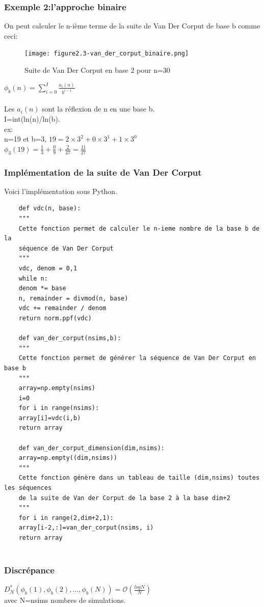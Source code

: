 \documentclass[12pt]{report}
\begin{document}
\subsubsection{Exemple 2:l'approche binaire}
On peut calculer le n-ième terme de la suite de Van Der Corput de base b comme ceci:
\begin{figure}[h]
	\begin{center}
		\texttt{[image: figure2.3-van\_der\_corput\_binaire.png]}\\
	\end{center}
	\caption{Suite de Van Der Corput en base 2 pour n=30}
\end{figure}
$\phi_b(n)=\sum_{i=0}^{I}\frac{a_i(n)}{b^{i-1}}$\\\\
Les $a_i(n)$ sont la réflexion de n en une base b.\\
I=int(ln(n)/ln(b).\\
ex:\\
n=19 et b=3, $19=2\times3^2+0\times3^1+1\times3^0$\\
$\phi_3(19)=\frac{1}{3}+\frac{0}{9}+\frac{2}{27}=\frac{11}{27}$
\subsubsection{Implémentation de la suite de Van Der Corput}
Voici l'implémentation sous Python.\\
\begin{lstlisting}
	def vdc(n, base):
	"""
	Cette fonction permet de calculer le n-ieme nombre de la base b de la 
	séquence de Van Der Corput
	"""
	vdc, denom = 0,1
	while n:
	denom *= base
	n, remainder = divmod(n, base)
	vdc += remainder / denom
	return norm.ppf(vdc)
	
	def van_der_corput(nsims,b):
	"""
	Cette fonction permet de générer la séquence de Van Der Corput en base b
	"""
	array=np.empty(nsims)
	i=0
	for i in range(nsims):
	array[i]=vdc(i,b)
	return array
	
	def van_der_corput_dimension(dim,nsims):
	array=np.empty((dim,nsims))
	"""
	Cette fonction génère dans un tableau de taille (dim,nsims) toutes les séquences
	de la suite de Van der Corput de la base 2 à la base dim+2
	"""
	for i in range(2,dim+2,1):
	array[i-2,:]=van_der_corput(nsims, i)
	return array
	
\end{lstlisting}
\subsubsection{Discrépance}
$D_N^*(\phi_b(1),\phi_b(2),...,\phi_b(N))= \mathcal{O}(\frac{logN}{N})$ \\
avec N=nsims nombres de simulations.
\newpage
\end{document}
